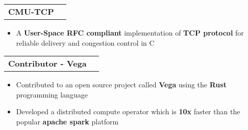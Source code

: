 \documentclass[12pt]{article}
\makeatletter
\newcommand{\resumeItem}[1]{
  \item\small{
    {#1}
  } 
  \vspace{-3pt}
}
\newcommand{\resumeProjectHeading}[2]{

    \vspace{-1pt}\item
    \begin{tabular*}{0.97\textwidth}[t]{l@{\extracolsep{\fill}}r}
      \small#1 & \small#2 \\ 
    \end{tabular*}
}
\newcommand{\resumeItemListStart}{\begin{itemize}\vspace{-8pt}}
\newcommand{\resumeItemListEnd}{\end{itemize}\vspace{-8pt}}
\makeatother
\begin{document}
  
        \resumeProjectHeading
         {\textbf{CMU-TCP}}{}
            \resumeItemListStart
              \resumeItem{A \textbf{User-Space RFC compliant} implementation of \textbf{TCP protocol} for reliable delivery and congestion control in C}
            \resumeItemListEnd

       
        

         
       
    
        \resumeProjectHeading       
          {\textbf{Contributor -  Vega}}{}
            \resumeItemListStart
              \resumeItem{Contributed to an open source project called \textbf{Vega} using the \textbf{Rust} programming language}
              \resumeItem{Developed a distributed compute operator which is \textbf{10x} faster than the popular \textbf{apache spark} platform}
            \resumeItemListEnd








  
\end{document}
